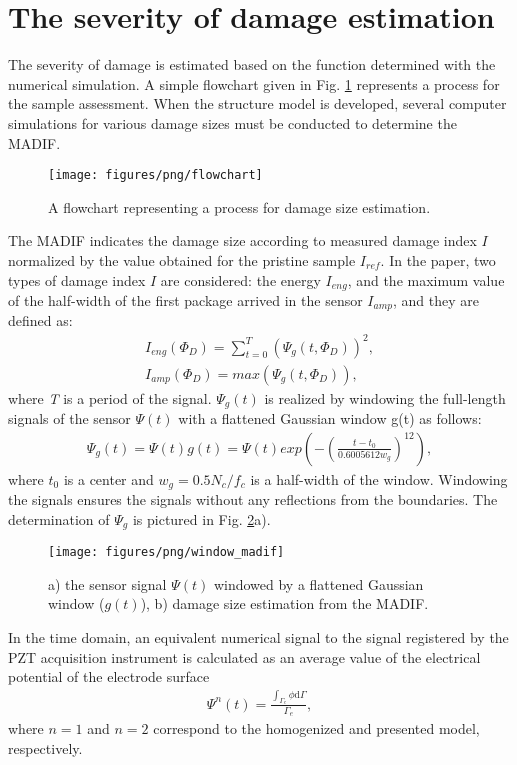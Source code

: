 \documentclass[sensors,article,submit,moreauthors,pdftex]{Definitions/mdpi}
\begin{document}
\section{The severity of damage estimation}
\label{sec:severity}
The severity of damage is estimated based on the function determined with the numerical simulation.
A simple flowchart given in Fig. \ref{fig:Flowchart} represents a process for the sample assessment.
When the structure model is developed, several computer simulations for various damage sizes must be conducted to determine the MADIF.
\begin{figure}
	\begin{center}
		\texttt{[image: figures/png/flowchart]}
	\end{center}
	\caption{A flowchart representing a process for damage size estimation.}
	\label{fig:Flowchart}
\end{figure}
The MADIF indicates the damage size according to measured damage index \(I\) normalized by the value obtained for the pristine sample \(I_{ref}\).
In the paper, two types of damage index \(I\) are considered: the energy \(I_{eng}\), and the maximum value of the half-width of the first package arrived in the sensor \(I_{amp}\), and they are defined as:
\begin{eqnarray}
	I_{eng}(\Phi_D)=\sum_{t=0}^{T} \left (\Psi_g(t,\Phi_D)\right )^2,\\
	I_{amp}(\Phi_D)=max\left ( \Psi_g(t,\Phi_D)\right ),
\label{eq:I_amp}
\end{eqnarray}
where \textit{T} is a period of the signal.
\(\Psi_g(t)\) is realized by windowing the full-length signals of the sensor \(\Psi(t)\) with a flattened Gaussian window g(t) as follows:
\begin{eqnarray}
	\Psi_g(t)=\Psi(t)g(t)= \Psi(t)exp\left(-\left(\frac{t-t_0}{0.6005612w_g}\right) ^{12}\right),
	\label{eq:psi_g}
\end{eqnarray}
where \(t_0\) is a center and \(w_g=0.5N_c/f_c\) is a half-width of the window.
Windowing the signals ensures the signals without any reflections from the boundaries.
The determination of \(\Psi_g\) is pictured in Fig. \ref{fig:window_madif}a).
\begin{figure}
	\begin{center}
		\texttt{[image: figures/png/window\_madif]}
	\end{center}
	\caption{a) the sensor signal \(\Psi(t)\) windowed by a flattened Gaussian window (\(g(t)\)), b) damage size estimation from the MADIF.}
	\label{fig:window_madif}
\end{figure}
In the time domain, an equivalent numerical signal to the signal registered by the PZT acquisition instrument is calculated as an average value of the electrical potential of the electrode surface
\begin{eqnarray}
	\Psi^{n}(t) = \frac{\int_{\Gamma_e}\phi\mathrm{d}\Gamma}{\Gamma_e},
	\label{eq:psi}
\end{eqnarray}
where \(n=1\) and \(n=2\) correspond to the homogenized and presented model, respectively.
\end{document}

